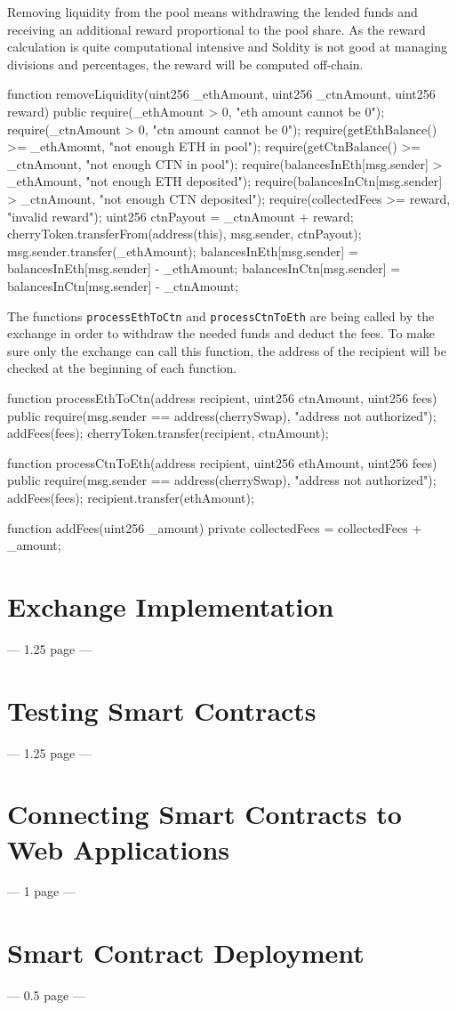 Removing liquidity from the pool means withdrawing the lended funds and receiving an additional reward proportional to the pool share. As the reward calculation is quite computational intensive and Soldity is not good at managing divisions and percentages, the reward will be computed off-chain.
\begin{GenericCode}
function removeLiquidity(uint256 _ethAmount, uint256 _ctnAmount, uint256 reward) public {
  require(_ethAmount > 0, "eth amount cannot be 0");
  require(_ctnAmount > 0, "ctn amount cannot be 0");
  require(getEthBalance() >= _ethAmount, "not enough ETH in pool");
  require(getCtnBalance() >= _ctnAmount, "not enough CTN in pool");
  require(balancesInEth[msg.sender] > _ethAmount, "not enough ETH deposited");
  require(balancesInCtn[msg.sender] > _ctnAmount, "not enough CTN deposited");
  require(collectedFees >= reward, "invalid reward");
  uint256 ctnPayout = _ctnAmount + reward;
  cherryToken.transferFrom(address(this), msg.sender, ctnPayout);
  msg.sender.transfer(_ethAmount);
  balancesInEth[msg.sender] = balancesInEth[msg.sender] - _ethAmount;
  balancesInCtn[msg.sender] = balancesInCtn[msg.sender] - _ctnAmount;
}	
\end{GenericCode}

The functions \texttt{processEthToCtn} and \texttt{processCtnToEth} are being called by the exchange in order to withdraw the needed funds and deduct the fees. To make sure only the exchange can call this function, the address of the recipient will be checked at the beginning of each function.
\begin{GenericCode}
function processEthToCtn(address recipient, uint256 ctnAmount, uint256 fees) public  {
  require(msg.sender == address(cherrySwap), "address not authorized");
  addFees(fees);
  cherryToken.transfer(recipient, ctnAmount);
}

function processCtnToEth(address recipient, uint256 ethAmount, uint256 fees) public {
  require(msg.sender == address(cherrySwap), "address not authorized");
  addFees(fees);
  recipient.transfer(ethAmount);
}

function addFees(uint256 _amount) private {
  collectedFees = collectedFees + _amount;
}	
\end{GenericCode}

\section{Exchange Implementation}
--- 1.25 page ---

\section{Testing Smart Contracts}
--- 1.25 page ---

\section{Connecting Smart Contracts to Web Applications}
--- 1 page ---

\section{Smart Contract Deployment}
--- 0.5 page ---
